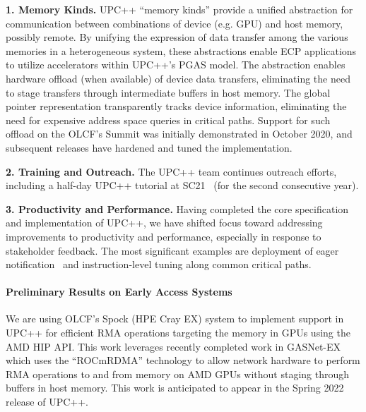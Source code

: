 \textbf{1. Memory Kinds.}
UPC++ ``memory kinds'' provide a unified abstraction for communication between
combinations of device (e.g. GPU) and host memory, possibly remote.  By
unifying the expression of data transfer among the various memories in a
heterogeneous system, these abstractions enable ECP
applications to utilize accelerators within UPC++'s PGAS model.  The
abstraction enables hardware offload (when available) of device data transfers,
eliminating the need to stage transfers through
intermediate buffers in host memory.
The global pointer representation transparently tracks device information,
eliminating the need for expensive address space queries in critical paths.
Support for such offload on the OLCF's
Summit was initially demonstrated in October 2020, and subsequent releases
have hardened and tuned the implementation.

\textbf{2. Training and Outreach.}
The UPC++ team continues outreach efforts, including a half-day UPC++
tutorial at SC21~\cite{sc21-upcxx-tutorial} (for the second consecutive year).

\textbf{3. Productivity and Performance.}
Having completed the core specification and implementation of UPC++, we have
shifted focus toward addressing improvements to productivity and performance,
especially in response to stakeholder feedback.  The most significant
examples are deployment of eager notification~\cite{pawatm21-upcxx-as_eager} 
and instruction-level tuning along common critical paths.

\paragraph{Preliminary Results on Early Access Systems}

We are using OLCF's Spock (HPE Cray EX) system to implement support in UPC++ for efficient RMA
operations targeting the memory in GPUs using the AMD HIP API.  This work
leverages recently completed work in GASNet-EX which uses the ``ROCmRDMA''
technology to allow network hardware to perform RMA operations to and from
memory on AMD GPUs without staging through buffers in host memory.  This work is
anticipated to appear in the Spring 2022 release of UPC++.

